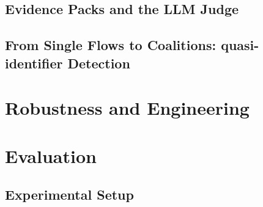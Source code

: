 \documentclass[sigconf,anonymous,review]{acmart}
\newcommand{\qi}{quasi-identifier\xspace}
\begin{document}
\subsection{Evidence Packs and the LLM Judge}\label{sec:code:judge}
\subsection{From Single Flows to Coalitions: \qi{} Detection}\label{sec:code:qi}

\section{Robustness and Engineering}\label{sec:robust}

\section{Evaluation}\label{sec:eval}
\subsection{Experimental Setup}\label{sec:eval:setup}
\end{document}
